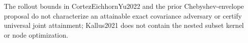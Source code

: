 The rollout bounds in CortezEichhornYu2022 and the prior Chebyshev-envelope proposal do not characterize an attainable exact covariance adversary or certify universal joint attainment; Kallus2021 does not contain the nested subset kernel or node optimization.